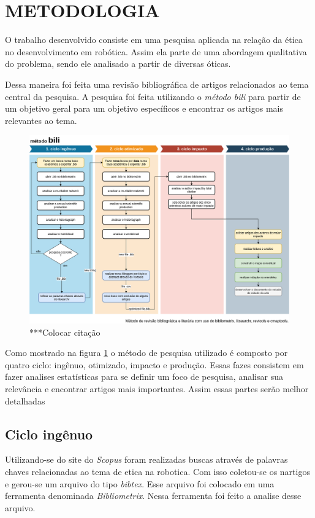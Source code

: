 \section{METODOLOGIA}

O trabalho desenvolvido consiste em uma pesquisa aplicada na relação da ética no desenvolvimento em robótica. Assim ela parte de uma abordagem qualitativa do problema, sendo ele analisado a partir de diversas óticas.

Dessa maneira foi feita uma revisão bibliográfica de artigos relacionados ao tema central da pesquisa. A pesquisa foi feita utilizando o \textit{método bili} \cite{Brazilia89:online} para partir de um objetivo geral para um objetivo específicos e encontrar os artigos mais relevantes ao tema.  

\begin{figure}[h!]
   \centering
       \includegraphics[width=15cm]{source/pictures/bili.png}
   \caption{***Colocar   citação}
   \label{fig:bili}
\end{figure}

Como mostrado na figura \ref{fig:bili} o método de pesquisa utilizado é composto por quatro ciclo: ingênuo, otimizado, impacto e produção. Essas fazes consistem em fazer analises estatísticas para se definir um foco de pesquisa, analisar sua relevância e encontrar artigos mais importantes. Assim essas partes serão melhor detalhadas

\subsection{Ciclo ingênuo}
Utilizando-se do site do \textit{Scopus} foram realizadas buscas através de palavras chaves relacionadas ao tema de etica na robotica. Com isso coletou-se os nartigos e gerou-se um arquivo do tipo \textit{bibtex}. Esse arquivo foi colocado em uma ferramenta denominada \textit{Bibliometrix}. Nessa ferramenta foi feito a analise desse arquivo.

